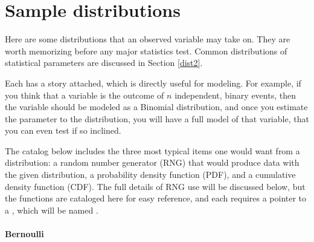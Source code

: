 
\section{Sample distributions}
\label{distlist}


Here are some distributions that an observed variable may take on. They are
worth memorizing before any major statistics test. Common distributions
of statistical parameters are discussed in Section \ref{dist2}.

Each has a story attached, which is directly useful for
modeling. For example, if you think that a variable is the outcome of $n$
independent, binary events, then the variable should be modeled as a
Binomial distribution, and once you estimate the parameter to the
distribution, you will have a full model of that variable, that you can
even test if so inclined.

The catalog below includes the three most typical items one would want
from a distribution: a random number generator (RNG) that would produce
data with the given distribution, a probability density function (PDF),
and a cumulative density function (CDF). The full details of RNG use
will be discussed below, but the functions are cataloged here for easy
reference, and each requires a pointer to a , which will be
named .


\paragraph{Bernoulli}

